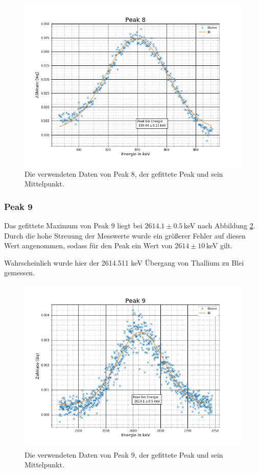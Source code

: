 \begin{figure}[h]
	\centering
	\includegraphics[scale=0.7]{Bilder/Anhang/P8}
	\caption[Thorium Peak 8]{\small Die verwendeten Daten von Peak 8, der gefittete Peak und sein Mittelpunkt.}
	\label{p8}
\end{figure}

\subsubsection{Peak 9}
Das gefittete Maximum von Peak 9 liegt bei $2614.1\pm0.5\,$keV nach Abbildung \ref{p9}. Durch die hohe Streuung der Messwerte wurde ein größerer Fehler auf diesen Wert angenommen, sodass für den Peak ein Wert von $2614\pm10\,$keV gilt.\par
Wahrscheinlich wurde hier der 2614.511 keV \cite{Thallium} Übergang von Thallium zu Blei gemessen.

\begin{figure}[h]
\centering
\includegraphics[scale=0.7]{Bilder/Anhang/P9}
\caption[Thorium Peak 9]{\small Die verwendeten Daten von Peak 9, der gefittete Peak und sein Mittelpunkt.}
\label{p9}
\end{figure}